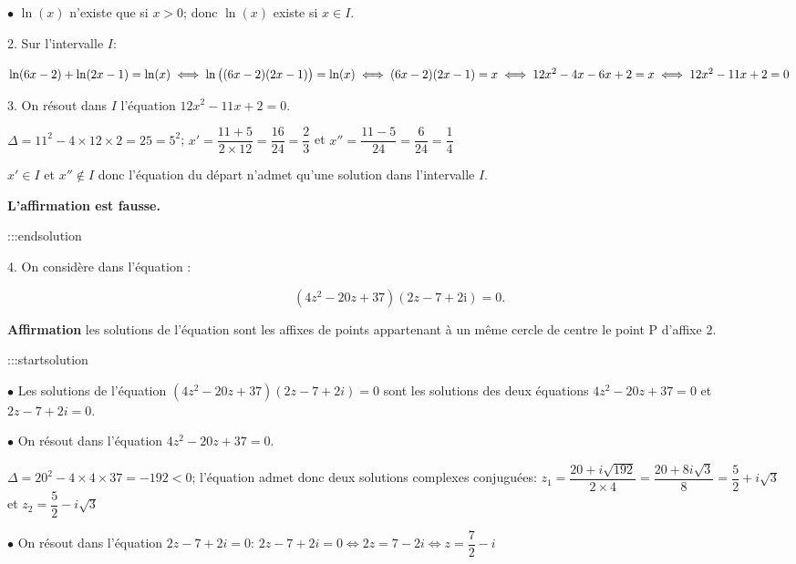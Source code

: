 \documentclass{cornouaille}
\begin{document}
$\bullet$  $\ln\left (x\right )$ n'existe que si $x>0$; donc $\ln\left (x\right )$ existe si $x\in I$.






2.  Sur l'intervalle $I$:

$\ln (6 x - 2) + \ln (2x - 1) = \ln (x)
\iff \ln \left ((6 x - 2)(2x - 1)\strut\right ) = \ln (x)
\iff  (6 x - 2)(2x - 1) = x \newline
\iff 12x^2 - 4x - 6x + 2 = x
\iff 12x^2 -11x +2=0$


3.  On résout dans $I$ l'équation $12x^2 -11x +2=0$.

$\Delta = 11^2 - 4\times 12\times 2 = 25 = 5^2$;
$x'=\dfrac{11+5}{2\times 12} = \dfrac{16}{24}=\dfrac{2}{3}$ et
$x''=\dfrac{11-5}{24}=\dfrac{6}{24}= \dfrac{1}{4}$

$x'\in I$ et $x'' \not\in I$ donc l'équation du départ n'admet qu'une solution dans l'intervalle $I$.




\textbf{L'affirmation est fausse.}


:::endsolution


4.   On considère dans  l'équation :


$$
\left(4z^2 - 20z + 37\right)(2z -7 + 2\text{i}) = 0.
$$




\textbf{Affirmation} les solutions de l'équation sont les affixes de points appartenant à un même
cercle de centre le point P d'affixe $2$.


:::startsolution







$\bullet$  Les solutions de l'équation $\left(4z^2 - 20z + 37\right)(2z -7 + 2i) = 0$ sont les solutions des deux équations $4z^2 - 20z + 37 = 0$ et $2z -7 + 2i = 0$.


$\bullet$  On résout dans  l'équation $4z^2 - 20z + 37 = 0$.

$\Delta=20^2 - 4\times 4\times 37 = -192<0$; l'équation admet donc deux solutions complexes conjuguées:
$z_1 = \dfrac{20 + i \sqrt{192}}{2\times 4} = \dfrac{20 + 8i \sqrt{3}}{8} = \dfrac{5}{2}+i\sqrt{3}$ et $z_2 = \dfrac{5}{2} - i\sqrt{3}$



$\bullet$  On résout dans  l'équation $2z-7+2i=0$:
$2z-7+2i=0 \iff 2z=7-2i \iff z = \dfrac{7}{2} - i$
\end{document}
